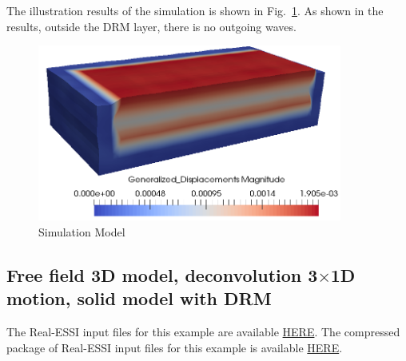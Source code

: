 The illustration results of the simulation is shown in Fig.~\ref{fig_decon_3D_motion_3D_model_results_free_field}.
As shown in the results, outside the DRM layer, there is no outgoing waves. 

\begin{figure}[H]
  \centering
  \includegraphics[width = 10cm]{./Figure-files/Day2/Deconvolution_3by1D_Motions/Free_fields_3D_model_with_DRM/motion3D_DRM3D_free_field.png}
  \caption{Simulation Model}
  \label{fig_decon_3D_motion_3D_model_results_free_field}
\end{figure}


\clearpage
\newpage
\subsection{Free field 3D model, deconvolution  3$\times$1D motion, solid model with DRM}
\label{Earthquake_Soil-structure_interaction_3D_model_with_DRM3}

The Real-ESSI input files for this example are available 
\href{https://github.com/yuan-energy/Real-ESSI-Short-Course-Examples/tree/master/short-course-examples/Day2/Deconvolution_3by1D_Motions/Earthquake_Soil-structure_interaction_3D_model_with_DRM}{HERE}. 
The compressed package of Real-ESSI input files for this example is available 
\href{https://github.com/yuan-energy/Real-ESSI-Short-Course-Examples/blob/master/short-course-examples/Day2/Deconvolution_3by1D_Motions/Earthquake_Soil-structure_interaction_3D_model_with_DRM/Earthquake_Soil-structure_interaction_3D_model_with_DRM.tgz?raw=true}{HERE}. 


